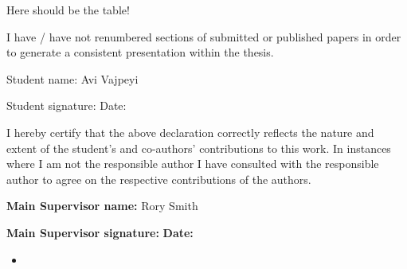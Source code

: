 {Here should be the table!

I have / have not renumbered sections of submitted or published papers
in order to generate a consistent presentation within the thesis.

Student name: Avi Vajpeyi

Student signature: Date:

I hereby certify that the above declaration correctly reflects the
nature and extent of the student's and co-authors' contributions to this
work. In instances where I am not the responsible author I have
consulted with the responsible author to agree on the respective
contributions of the authors.

\textbf{Main Supervisor name:} Rory Smith

\textbf{Main Supervisor signature:} \textbf{Date:}



\begin{itemize}
\item
\end{itemize}














}
